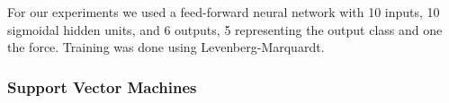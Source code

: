 %

For our experiments we used a feed-forward neural network with 10
inputs, 10 sigmoidal hidden units, and 6 outputs, 5 representing
the output class and one the force. Training was done using
Levenberg-Marquardt.
%

\subsubsection{Support Vector Machines}


